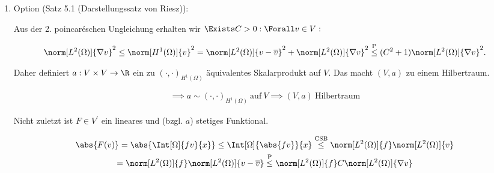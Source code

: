 \begin{solution}
\begin{enumerate}[label = \alph*)]
\begin{enumerate}[label = \arabic*.]
\begin{itemize}
            \item Stetigkeit von $F$:

            \begin{align*}
                \abs{F(v)}
                =
                \abs{\Int[\Omega]{f v}{x}}
                \leq
                \Int[\Omega]{\abs{f v}}{x}
                =
                \norm[L^1(\Omega)]{f v}
                \stackrel
                {
                \mathrm{CSB}
                }{\leq}
                \norm[L^2(\Omega)]{f} \norm[L^2(\Omega)]{v}
                \leq
                \norm[L^2(\Omega)]{f} \norm[H^1(\Omega)]{v}
            \end{align*}

        \end{itemize}

        \item Option (Satz 5.1 (Darstellungssatz von Riesz)):



        Aus der 2. poincaréschen Ungleichung erhalten wir $\Exists C > 0: \Forall v \in V:$

        \begin{align*}
            \norm[L^2(\Omega)]{\nabla v}^2
            \leq
            \norm[H^1(\Omega)]{v}^2
            =
            \norm[L^2(\Omega)]{v - \overline{v}}^2 + \norm[L^2(\Omega)]{\nabla v}^2
            \stackrel
            {
                \mathrm{P}
            }{\leq}
            (C^2 + 1) \norm[L^2(\Omega)]{\nabla v}^2.
        \end{align*}

        Daher definiert $a: V \times V \to \R$ ein zu $(\cdot, \cdot)_{H^1(\Omega)}$ äquivalentes Skalarprodukt auf $V$.
        Das macht $(V, a)$ zu einem Hilbertraum.

        \begin{align*}
            \implies
            a \sim (\cdot, \cdot)_{H^1(\Omega)} ~\text{auf}~ V
            \implies
            (V, a) ~\text{Hilbertraum}
        \end{align*}

        Nicht zuletzt ist $F \in V^\prime$ ein lineares und (bzgl. $a$) stetiges Funktional.

        \begin{multline*}
            \abs{F(v)}
            =
            \abs{\Int[\Omega]{f v}{x}}
            \leq
            \Int[\Omega]{\abs{f v}}{x}
            \stackrel
            {
                \mathrm{CSB}
            }{\leq}
            \norm[L^2(\Omega)]{f} \norm[L^2(\Omega)]{v} \\
            =
            \norm[L^2(\Omega)]{f} \norm[L^2(\Omega)]{v - \overline{v}}
            \stackrel
            {
                \mathrm{P}
            }{\leq}
            \norm[L^2(\Omega)]{f} C \norm[L^2(\Omega)]{\nabla v}
        \end{multline*}


\end{enumerate}
\end{enumerate}
\end{solution}
